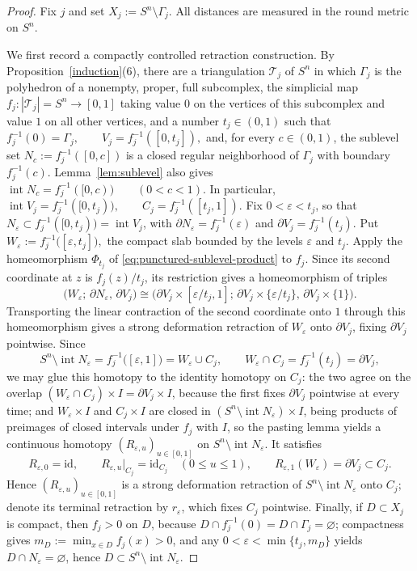 \documentclass[12pt,oneside,a4paper]{article}
\theoremstyle{mytheorem}
\theoremstyle{remark}
\theoremstyle{definition}
\begin{document}
\begin{proof}
Fix $j$ and set $X_j:=S^n\setminus\Gamma_j$.  All distances are
measured in the round metric on $S^n$.

We first record a compactly controlled retraction construction.  By
Proposition~\ref{induction}(6), there are a triangulation $\mathcal{T}_j$
of $S^n$ in which $\Gamma_j$ is the polyhedron of a nonempty, proper, full
subcomplex, the simplicial map
$f_j:|\mathcal{T}_j|=S^n\to[0,1]$ taking value $0$ on the vertices of
this subcomplex and value $1$ on all other vertices, and a number
$t_j\in(0,1)$ such that
$f_j^{-1}(0)=\Gamma_j,\qquad V_j=f_j^{-1}([0,t_j]),$
and, for every $c\in(0,1)$, the sublevel set
$N_c:=f_j^{-1}([0,c])$ is a closed regular neighborhood of $\Gamma_j$
with boundary $f_j^{-1}(c)$.  Lemma~\ref{lem:sublevel} also gives
$\operatorname{int}N_c=f_j^{-1}([0,c))
 \qquad(0<c<1).$
In particular,
$\operatorname{int}V_j=f_j^{-1}([0,t_j)),
 \qquad
 C_j=f_j^{-1}([t_j,1]).$
Fix $0<\varepsilon<t_j$, so that
$N_\varepsilon\subset f_j^{-1}([0,t_j))=\operatorname{int}V_j$, with
$\partial N_\varepsilon=f_j^{-1}(\varepsilon)$ and
$\partial V_j=f_j^{-1}(t_j)$.  Put
$W_\varepsilon:=f_j^{-1}\bigl([\varepsilon,t_j]\bigr),$ the compact slab bounded
by the levels $\varepsilon$ and $t_j$.  Apply
the homeomorphism $\Phi_{t_j}$ of
\eqref{eq:punctured-sublevel-product} to $f_j$.  Since its second
coordinate at $z$ is $f_j(z)/t_j$, its restriction gives a
homeomorphism of triples
\[
\bigl(W_\varepsilon;\,\partial N_\varepsilon,\,\partial V_j\bigr)
\cong
\bigl(\partial V_j\times[\varepsilon/t_j,1];\,
\partial V_j\times\{\varepsilon/t_j\},\,
\partial V_j\times\{1\}\bigr).
\]
Transporting the linear contraction of the second coordinate onto $1$
through this homeomorphism gives a strong deformation retraction of
$W_\varepsilon$ onto $\partial V_j$, fixing $\partial V_j$ pointwise.
Since
\[
S^n\setminus\operatorname{int}N_\varepsilon
=f_j^{-1}\bigl([\varepsilon,1]\bigr)
=W_\varepsilon\cup C_j,
\qquad
W_\varepsilon\cap C_j=f_j^{-1}(t_j)=\partial V_j,
\]
we may glue this homotopy to the identity homotopy on $C_j$: the two
agree on the overlap $(W_\varepsilon\cap C_j)\times I=\partial V_j\times I$,
because the first fixes $\partial V_j$ pointwise at every time; and
$W_\varepsilon\times I$ and $C_j\times I$ are closed in
$(S^n\setminus\operatorname{int}N_\varepsilon)\times I$, being
products of preimages of closed intervals under $f_j$ with $I$, so the
pasting lemma yields a continuous homotopy
$(R_{\varepsilon,u})_{u\in[0,1]}$ on
$S^n\setminus\operatorname{int}N_\varepsilon$.  It satisfies
\[
 R_{\varepsilon,0}=\mathrm{id},
 \qquad
 R_{\varepsilon,u}|_{C_j}=\mathrm{id}_{C_j}\quad(0\leq u\leq1),
 \qquad
 R_{\varepsilon,1}(W_\varepsilon)=\partial V_j\subset C_j.
\]
Hence $(R_{\varepsilon,u})_{u\in[0,1]}$ is a strong deformation
retraction of $S^n\setminus\operatorname{int}N_\varepsilon$ onto $C_j$; denote
its terminal retraction by $r_\varepsilon$, which fixes $C_j$
pointwise.  Finally, if $D\subset X_j$ is compact, then $f_j>0$ on $D$,
because $D\cap f_j^{-1}(0)=D\cap\Gamma_j=\varnothing$; compactness
gives $m_D:=\min_{x\in D}f_j(x)>0$, and any
$0<\varepsilon<\min\{t_j,m_D\}$ yields
$D\cap N_\varepsilon=\varnothing$, hence
$D\subset S^n\setminus\operatorname{int}N_\varepsilon$.


\end{proof}
\end{document}
